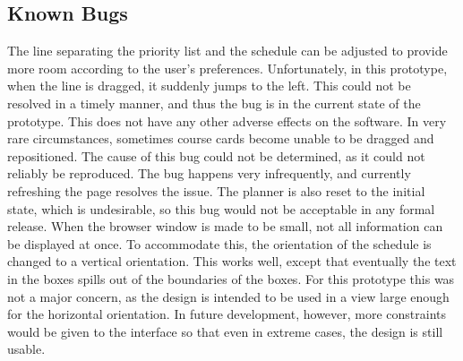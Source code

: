 \documentclass{article}
\begin{document}
\subsection{Known Bugs}
The line separating the priority list and the schedule can be adjusted to provide more room according to the user's preferences. Unfortunately, in this prototype, when the line is dragged, it suddenly jumps to the left. This could not be resolved in a timely manner, and thus the bug is in the current state of the prototype. This does not have any other adverse effects on the software.
\newline
\newline
In very rare circumstances, sometimes course cards become unable to be dragged and repositioned. The cause of this bug could not be determined, as it could not reliably be reproduced. The bug happens very infrequently, and currently refreshing the page resolves the issue. The planner is also reset to the initial state, which is undesirable, so this bug would not be acceptable in any formal release.
\newline
\newline
When the browser window is made to be small, not all information can be displayed at once. To accommodate this, the orientation of the schedule is changed to a vertical orientation. This works well, except that eventually the text in the boxes spills out of the boundaries of the boxes. For this prototype this was not a major concern, as the design is intended to be used in a view large enough for the horizontal orientation. In future development, however, more constraints would be given to the interface so that even in extreme cases, the design is still usable.
\end{document}
